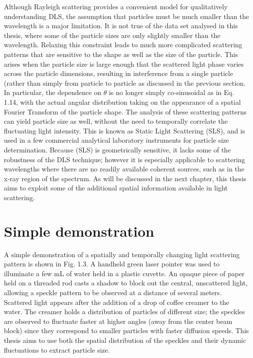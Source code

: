 Although Rayleigh scattering provides a convenient model for qualitatively understanding DLS, the assumption that particles must be much smaller than the wavelength is a major limitation. It is not true of the data set analysed in this thesis, where some of the particle sizes are only slightly smaller than the wavelength. Relaxing this constraint leads to much more complicated scattering patterns that are sensitive to the shape as well as the size of the particle. This arises when the particle size is large enough that the scattered light phase varies across the particle dimensions, resulting in interference from a single particle (rather than simply from particle to particle as discussed in the previous section. In particular, the dependence on $\theta$ is no longer simply co-sinusoidal as in Eq. 1.14, with the actual angular distribution taking on the appearance of a spatial Fourier Transform of the particle shape.  The analysis of these scattering patterns can yield particle size as well, without the need to temporally correlate the fluctuating light intensity. This is known as Static Light Scattering (SLS), and is used in a few commercial analytical laboratory instruments for particle size determination. Because (SLS) is geometrically sensitive, it lacks some of the robustness of the DLS technique; however it is especially applicable to scattering wavelengths where there are no readily available coherent sources, such as in the x-ray region of the spectrum. As will be discussed in the next chapter, this thesis aims to exploit some of the additional spatial information available in light scattering.

\vspace{10mm}

\section{Simple demonstration}

A simple demonstration of a spatially and temporally changing light scattering pattern is shown in Fig. 1.3.  A handheld green laser pointer was used to illuminate a few mL of water held in a plastic cuvette. An opaque piece of paper held on a threaded rod casts a shadow to block out the central, unscattered light, allowing a speckle pattern to be observed at a distance of several meters.  Scattered light appears after the addition of a drop of coffee creamer to the water. The creamer holds a distribution of particles of different size; the speckles are observed to fluctuate faster at higher angles (away from the center beam block) since they correspond to smaller particles with faster diffusion speeds.  This thesis aims to use both the spatial distribution of the speckles and their dynamic fluctuations to extract particle size.


